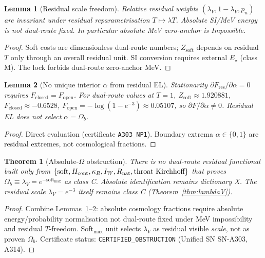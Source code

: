 \documentclass[11pt,a4paper]{article}
\newtheorem{theorem}{Theorem}
\newtheorem{lemma}{Lemma}
\theoremstyle{remark}
\begin{document}
\begin{lemma}[Residual scale freedom]
\label{lem:scale}
Relative residual weights $(\lambda_V,1-\lambda_V,p_n)$ are invariant under residual reparametrisation $T\mapsto\lambda T$. Absolute SI/MeV energy is not dual-route fixed. In particular absolute MeV zero-anchor is Impossible.
\end{lemma}

\begin{proof}
Soft costs are dimensionless dual-route numbers; $Z_{\mathrm{soft}}$ depends on residual $T$ only through an overall residual unit. SI conversion requires external $E_\star$ (class M). The lock forbids dual-route zero-anchor MeV.
\end{proof}

\begin{lemma}[No unique interior $\alpha$ from residual EL]
\label{lem:alpha}
Stationarity $\partial F_{\mathrm{res}}/\partial\alpha=0$ requires $F_{\mathrm{closed}}=F_{\mathrm{open}}$. For dual-route values at $T=1$, $Z_{\mathrm{soft}}\approx 1.920881$, $F_{\mathrm{closed}}\approx -0.6528$, $F_{\mathrm{open}}=-\log(1-e^{-3})\approx 0.05107$, so $\partial F/\partial\alpha\neq 0$. Residual EL does not select $\alpha=\Omega_b$.
\end{lemma}

\begin{proof}
Direct evaluation (certificate \texttt{A303\_NP1}). Boundary extrema $\alpha\in\{0,1\}$ are residual extremes, not cosmological fractions.
\end{proof}

\begin{theorem}[Absolute-$\Omega$ obstruction]
\label{thm:Omega-obs}
There is no dual-route residual functional built only from
$\{\mathrm{soft},H_{\rm cont},\kappa_R,I_W,R_{\rm nat},\text{throat Kirchhoff}\}$
that proves $\Omega_b\equiv\lambda_V=e^{-\mathrm{soft}_{\max}}$ as class C.
Absolute identification remains dictionary X. The residual scale $\lambda_V=e^{-3}$ itself remains class C (Theorem~\ref{thm:lambdaV}).
\end{theorem}

\begin{proof}
Combine Lemmas~\ref{lem:scale}--\ref{lem:alpha}: absolute cosmology fractions require absolute energy/probability normalisation not dual-route fixed under MeV impossibility and residual $T$-freedom. Soft$_{\max}$ unit selects $\lambda_V$ as residual visible \emph{scale}, not as proven $\Omega_b$. Certificate status: \texttt{CERTIFIED\_OBSTRUCTION} (Unified SN SN-A303, A314).
\end{proof}
\end{document}
